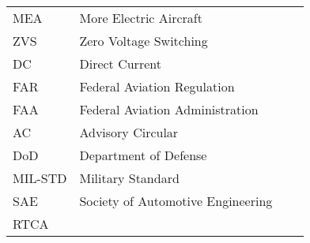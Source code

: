 \begin{longtable}{llll}
	MEA     & More Electric Aircraft                    \\
	ZVS     & Zero Voltage Switching                    \\
	DC      & Direct Current                            \\
	FAR     & Federal Aviation Regulation               \\
	FAA     & Federal Aviation Administration           \\
	AC      & Advisory Circular                         \\
	DoD     & Department of Defense                     \\
	MIL-STD & Military Standard                         \\
	SAE     & Society of Automotive Engineering         \\
	RTCA    \end{longtable}

